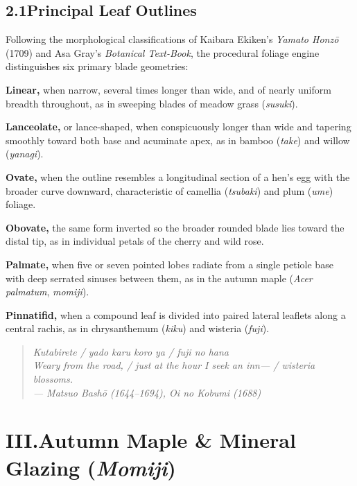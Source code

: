 \documentclass[11pt,a4paper,twoside]{article}
\begin{document}
\subsection*{2.1\quad Principal Leaf Outlines}

Following the morphological classifications of Kaibara Ekiken's \emph{Yamato Honz\=o} (1709) and Asa Gray's \emph{Botanical Text-Book}, the procedural foliage engine distinguishes six primary blade geometries:

\medskip
\noindent\textbf{Linear,} when narrow, several times longer than wide, and of nearly uniform breadth throughout, as in sweeping blades of meadow grass (\emph{susuki}).

\smallskip
\noindent\textbf{Lanceolate,} or lance-shaped, when conspicuously longer than wide and tapering smoothly toward both base and acuminate apex, as in bamboo (\emph{take}) and willow (\emph{yanagi}).

\smallskip
\noindent\textbf{Ovate,} when the outline resembles a longitudinal section of a hen's egg with the broader curve downward, characteristic of camellia (\emph{tsubaki}) and plum (\emph{ume}) foliage.

\smallskip
\noindent\textbf{Obovate,} the same form inverted so the broader rounded blade lies toward the distal tip, as in individual petals of the cherry and wild rose.

\smallskip
\noindent\textbf{Palmate,} when five or seven pointed lobes radiate from a single petiole base with deep serrated sinuses between them, as in the autumn maple (\emph{Acer palmatum}, \emph{momiji}).

\smallskip
\noindent\textbf{Pinnatifid,} when a compound leaf is divided into paired lateral leaflets along a central rachis, as in chrysanthemum (\emph{kiku}) and wisteria (\emph{fuji}).

\medskip
\begin{quote}
\itshape
Kutabirete / yado karu koro ya / fuji no hana\\[2pt]
Weary from the road, / just at the hour I seek an inn--- / wisteria blossoms.\\[2pt]
\upshape\small --- Matsuo Bash\=o (1644--1694), \emph{Oi no Kobumi} (1688)
\end{quote}

\clearpage

\section*{III.\quad Autumn Maple \& Mineral Glazing (\emph{Momiji})}
\end{document}
